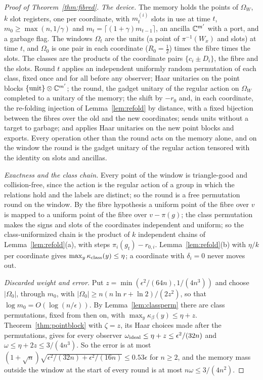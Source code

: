 \begin{proof}[Proof of Theorem~\ref{thm:fibred}]
\emph{The device.} The memory holds the points of $\Omega_W$, $k$ slot registers, one per coordinate, with $m^{(i)}_t$ slots in use at time $t$, $m_0\ge\max(n,1/\gamma)$ and
$m_t=\lceil(1+\gamma)m_{t-1}\rceil$, an ancilla $\mathbb C^{m'}$ with a port, and a garbage flag. The windows $\Omega_t$ are the units (a point of $\pi^{-1}(W_x)$ and slots) at time
$t$, and $\Omega_0$ is one pair in each coordinate ($R_0=\frac12$) times the fibre times the slots. The classes are the products of the coordinate pairs $\{c_i\pm D_i\}$, the
fibre and the slots. Round $t$ applies an independent uniformly random permutation of each class, fixed once and for all before any observer; Haar unitaries on the point
blocks $\{\text{unit}\}\otimes\mathbb C^{m'}$; the round, the gadget unitary of the regular action on $\Omega_W$ completed to a unitary of the memory; the shift by $-r_0$ and, in each
coordinate, the re-folding injection of Lemma~\ref{lem:refold} by distance, with a fixed bijection between the fibres over the old and the new coordinates; sends units
without a target to garbage; and applies Haar unitaries on the new point blocks and exports. Every operation other than the round acts on the memory alone, and on the window
the round is the gadget unitary of the regular action tensored with the identity on slots and ancillas.

\emph{Exactness and the class chain.} Every point of the window is triangle-good and collision-free, since the action is the regular action of a group in which the
relations hold and the labels are distinct; so the round is a free permutation round on the window. By the fibre hypothesis a uniform point of the fibre over $v$ is mapped
to a uniform point of the fibre over $v-\pi(g)$; the class permutation makes the signs and slots of the coordinates independent and uniform; so the class-uniformized chain
is the product of $k$ independent chains of Lemma~\ref{lem:refold}(a), with steps $\pi_i(g_t)-r_{0,i}$. Lemma~\ref{lem:refold}(b) with $\eta/k$ per coordinate gives
$\max_y\kappa_{\rm class}(y)\le\eta$; a coordinate with $\delta_i=0$ never moves out.

\emph{Discarded weight and error.} Put $z=\min(\epsilon^2/(64n),1/(4n^3))$ and choose $|\Omega_0|$, through $m_0$, with $|\Omega_0|\ge n(n\ln r+\ln2)/(2z^2)$, so that
$\log m_0=O(\log(n/\epsilon))$. By Lemma~\ref{lem:classperm} there are class permutations, fixed from then on, with $\max_y\kappa_\beta(y)\le\eta+z$. Theorem~\ref{thm:pointblock}
with $\zeta=z$, its Haar choices made after the permutations, gives for every observer $\omega_{\rm ideal}\le\eta+z\le\epsilon^2/(32n)$ and $\omega\le\eta+2z\le3/(4n^3)$. So the
error is at most $(1+\sqrt n)\sqrt{\epsilon^2/(32n)+\epsilon^2/(16n)}\le0.53\epsilon$ for $n\ge2$, and the memory mass outside the window at the start of every round is at most
$n\omega\le3/(4n^2)$.


\end{proof}
